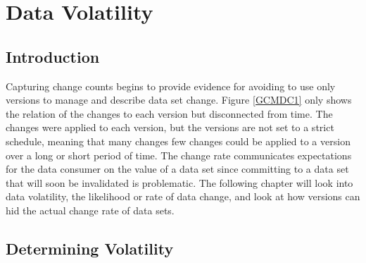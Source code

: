 
\chapter{Data Volatility} \label{Volatility}

\section{Introduction}

Capturing change counts begins to provide evidence for avoiding to use only versions to manage and describe data set change.
Figure \ref{GCMDC1} only shows the relation of the changes to each version but disconnected from time.
The changes were applied to each version, but the versions are not set to a strict schedule, meaning that many changes few changes could be applied to a version over a long or short period of time.
The change rate communicates expectations for the data consumer on the value of a data set since committing to a data set that will soon be invalidated is problematic.
The following chapter will look into data volatility, the likelihood or rate of data change, and look at how versions can hid the actual change rate of data sets.

\section{Determining Volatility}

